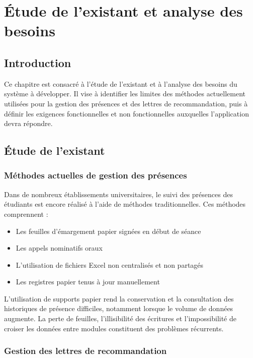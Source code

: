 \documentclass[12pt, a4paper, openright]{report}
\begin{document}
\chapter{Étude de l'existant et analyse des besoins}
\thispagestyle{fancy}

\section{Introduction}

Ce chapitre est consacré à l'étude de l'existant et à l'analyse des besoins du système à développer. Il vise à identifier les limites des méthodes actuellement utilisées pour la gestion des présences et des lettres de recommandation, puis à définir les exigences fonctionnelles et non fonctionnelles auxquelles l'application devra répondre.

\section{Étude de l'existant}

\subsection{Méthodes actuelles de gestion des présences}

Dans de nombreux établissements universitaires, le suivi des présences des étudiants est encore réalisé à l'aide de méthodes traditionnelles. Ces méthodes comprennent :

\begin{itemize}
    \item Les feuilles d'émargement papier signées en début de séance
    \item Les appels nominatifs oraux
    \item L'utilisation de fichiers Excel non centralisés et non partagés
    \item Les registres papier tenus à jour manuellement
\end{itemize}

L'utilisation de supports papier rend la conservation et la consultation des historiques de présence difficiles, notamment lorsque le volume de données augmente. La perte de feuilles, l'illisibilité des écritures et l'impossibilité de croiser les données entre modules constituent des problèmes récurrents.

\subsection{Gestion des lettres de recommandation}
\end{document}
